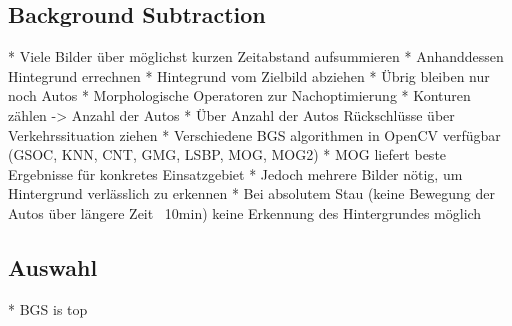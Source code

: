 \subsection{Background Subtraction}
* Viele Bilder über möglichst kurzen Zeitabstand aufsummieren\newline
* Anhanddessen Hintegrund errechnen\newline
* Hintegrund vom Zielbild abziehen\newline
* Übrig bleiben nur noch Autos\newline
* Morphologische Operatoren zur Nachoptimierung\newline
* Konturen zählen -> Anzahl der Autos\newline
* Über Anzahl der Autos Rückschlüsse über Verkehrssituation ziehen\newline
* Verschiedene BGS algorithmen in OpenCV verfügbar (GSOC, KNN, CNT, GMG, LSBP, MOG, MOG2)\newline
* MOG liefert beste Ergebnisse für konkretes Einsatzgebiet\newline
* Jedoch mehrere Bilder nötig, um Hintergrund verlässlich zu erkennen\newline
* Bei absolutem Stau (keine Bewegung der Autos über längere Zeit ~10min) keine Erkennung des Hintergrundes möglich\newline

\subsection{Auswahl}
* BGS is top

